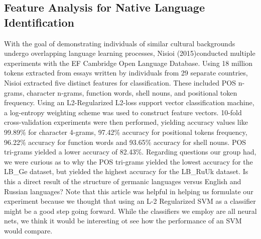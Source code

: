 \documentclass[11pt,a4paper]{article}
\newcommand\tab[1][1cm]{\hspace*{#1}}
\begin{document}
 \subsection{Feature Analysis for Native Language Identification}
 \tab With the goal of demonstrating individuals of similar cultural backgrounds undergo overlapping language learning processes, Nisioi (2015)conducted multiple experiments with the EF Cambridge Open Language Database. Using 18 million tokens extracted from essays written by individuals from 29 separate countries, Nisioi extracted five distinct features for classification. These included POS n-grams, character n-grams, function words, shell nouns, and positional token frequency. Using an L2-Regularized L2-loss support vector classification machine, a log-entropy weighting scheme was used to construct feature vectors. 10-fold cross-validation experiments were then performed, yielding accuracy values like 99.89\% for character 4-grams, 97.42\% accuracy for positional tokens frequency, 96.22\% accuracy for function words and 93.65\% accuracy for shell nouns. POS tri-grams yielded a lower accuracy of 82.43\%. Regarding questions our group had, we were curious as to why the POS tri-grams yielded the lowest accuracy for the LB\_Ge dataset, but yielded the highest accuracy for the LB\_RuUk dataset. Is this a direct result of the structure of germanic languages versus English and Russian languages? Note that this article was helpful in helping us formulate our experiment because we thought that using an L-2 Regularized SVM as a classifier might be a good step going forward. While the classifiers we employ are all neural nets, we think it would be interesting ot see how the performance of an SVM would compare. 
 
\end{document}
